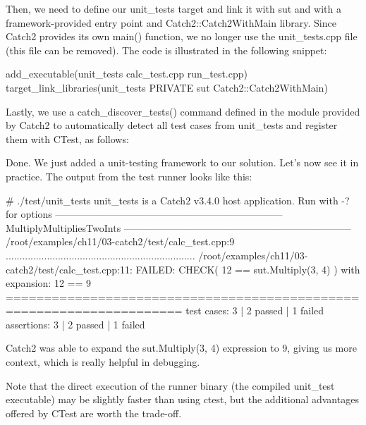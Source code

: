 Then, we need to define our unit\_tests target and link it with sut and with a framework-provided entry point and Catch2::Catch2WithMain library. Since Catch2 provides its own main() function, we no longer use the unit\_tests.cpp file (this file can be removed). The code is illustrated in the following snippet:


\begin{cmake}
add_executable(unit_tests calc_test.cpp run_test.cpp)
target_link_libraries(unit_tests PRIVATE
                      sut Catch2::Catch2WithMain)
\end{cmake}

Lastly, we use a catch\_discover\_tests() command defined in the module provided by Catch2 to automatically detect all test cases from unit\_tests and register them with CTest, as follows:



Done. We just added a unit-testing framework to our solution. Let’s now see it in practice. The output from the test runner looks like this:

\begin{shell}
# ./test/unit_tests
unit_tests is a Catch2 v3.4.0 host application.
Run with -? for options
---------------------------------------------------------------------
MultiplyMultipliesTwoInts
---------------------------------------------------------------------
/root/examples/ch11/03-catch2/test/calc_test.cpp:9
.....................................................................
/root/examples/ch11/03-catch2/test/calc_test.cpp:11: FAILED:
  CHECK( 12 == sut.Multiply(3, 4) )
with expansion:
  12 == 9
=====================================================================
test cases: 3 | 2 passed | 1 failed
assertions: 3 | 2 passed | 1 failed
\end{shell}

Catch2 was able to expand the sut.Multiply(3, 4) expression to 9, giving us more context, which is really helpful in debugging.

Note that the direct execution of the runner binary (the compiled unit\_test executable) may be slightly faster than using ctest, but the additional advantages offered by CTest are worth the trade-off.

